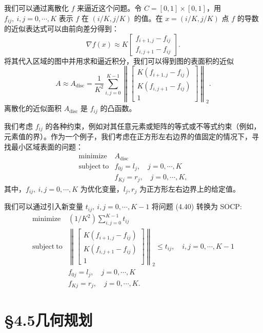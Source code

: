 \documentclass[UTF8,12pt,a4paper,fontset=fandol]{ctexart}
\begin{document}
我们可以通过离散化 $f$ 来逼近这个问题。令 $C=[0,1]\times[0,1]$，用 $f_{ij},\ i,j=0,\cdots,K$ 表示 $f$ 在 $(i/K,j/K)$ 的值。在 $x=(i/K,j/K)$ 点 $f$ 的导数的近似表达式可以由前向差分得到：
\[
\nabla f(x)\approx K
\begin{bmatrix}
f_{i+1,j}-f_{ij}\\
f_{i,j+1}-f_{ij}
\end{bmatrix}.
\]
将其代入区域的图中并用求和逼近积分，我们可以得到图的表面积的近似
\[
A\approx A_{\mathrm{disc}}=\frac{1}{K^2}\sum_{i,j=0}^{K-1}
\left\|
\begin{bmatrix}
K(f_{i+1,j}-f_{ij})\\
K(f_{i,j+1}-f_{ij})\\
1
\end{bmatrix}
\right\|_2.
\]
离散化的近似面积 $A_{\mathrm{disc}}$ 是 $f_{ij}$ 的凸函数。

我们考虑 $f_{ij}$ 的各种约束，例如对其任意元素或矩阵的等式或不等式约束（例如，元素值的界）。作为一个例子，我们考虑在正方形左右边界的值固定的情况下，寻找最小区域表面的问题：
\begin{equation}
\begin{array}{ll}
\mathop{\mathrm{minimize}} & A_{\mathrm{disc}}\\
\mathrm{subject\ to} & f_{0j}=l_j,\quad j=0,\cdots,K\\
& f_{Kj}=r_j,\quad j=0,\cdots,K,
\end{array}
\tag{4.40}
\end{equation}
其中，$f_{ij},\ i,j=0,\cdots,K$ 为优化变量，$l_j,r_j$ 为正方形左右边界上的给定值。

我们可以通过引入新变量 $t_{ij},\ i,j=0,\cdots,K-1$ 将问题 (4.40) 转换为 SOCP:
\[
\begin{array}{ll}
\mathop{\mathrm{minimize}} & (1/K^2)\displaystyle\sum_{i,j=0}^{K-1}t_{ij}\\
\mathrm{subject\ to} &
\left\|
\begin{bmatrix}
K(f_{i+1,j}-f_{ij})\\
K(f_{i,j+1}-f_{ij})\\
1
\end{bmatrix}
\right\|_2\leq t_{ij},\quad i,j=0,\cdots,K-1\\
& f_{0j}=l_j,\quad j=0,\cdots,K\\
& f_{Kj}=r_j,\quad j=0,\cdots,K.
\end{array}
\]

\section*{§4.5\quad 几何规划}
\end{document}
